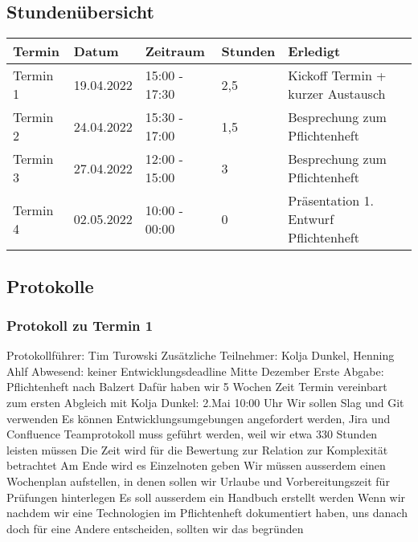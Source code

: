 \subsection{Stundenübersicht}

\begin{tabular}{|l|l|l|l|l|}
\hline
Termin & Datum & Zeitraum & Stunden & Erledigt \\
\hline
    Termin 1 & 19.04.2022 & 15:00 - 17:30 & 2,5 & Kickoff Termin + kurzer Austausch \\
	Termin 2 & 24.04.2022 & 15:30 - 17:00 & 1,5 & Besprechung zum Pflichtenheft \\
	Termin 3 & 27.04.2022 & 12:00 - 15:00 & 3 & Besprechung zum Pflichtenheft \\
	Termin 4 & 02.05.2022 & 10:00 - 00:00 & 0 & Präsentation 1. Entwurf Pflichtenheft \\
\hline
\end{tabular}

\subsection{Protokolle}
\subsubsection{Protokoll zu Termin 1}
Protokollführer: Tim Turowski \newline
Zusätzliche Teilnehmer: Kolja Dunkel, Henning Ahlf \newline
Abwesend: keiner \newline \newline
Entwicklungsdeadline Mitte Dezember \newline
Erste Abgabe: Pflichtenheft nach Balzert \newline
Dafür haben wir 5 Wochen Zeit \newline
Termin vereinbart zum ersten Abgleich mit Kolja Dunkel: 2.Mai 10:00 Uhr \newline
Wir sollen Slag und Git verwenden \newline
Es können Entwicklungsumgebungen angefordert werden, Jira und Confluence \newline
Teamprotokoll muss geführt werden, weil wir etwa 330 Stunden leisten müssen \newline
Die Zeit wird für die Bewertung zur Relation zur Komplexität betrachtet \newline
Am Ende wird es Einzelnoten geben \newline
Wir müssen ausserdem einen Wochenplan aufstellen, in denen sollen wir Urlaube und Vorbereitungszeit für Prüfungen hinterlegen \newline
Es soll ausserdem ein Handbuch erstellt werden \newline
Wenn wir nachdem wir eine Technologien im Pflichtenheft dokumentiert haben, uns danach doch für eine Andere entscheiden, sollten wir das begründen 

